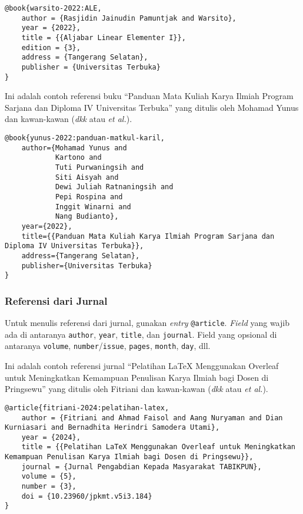 \begin{lstlisting}
@book{warsito-2022:ALE,
    author = {Rasjidin Jainudin Pamuntjak and Warsito},
    year = {2022},
    title = {{Aljabar Linear Elementer I}},
    edition = {3},
    address = {Tangerang Selatan},
    publisher = {Universitas Terbuka}
}
\end{lstlisting}

Ini adalah contoh referensi buku ``Panduan Mata Kuliah Karya Ilmiah Program Sarjana dan Diploma IV Universitas Terbuka'' yang ditulis oleh Mohamad Yunus dan kawan-kawan (\textit{dkk} atau \textit{et al.}).

\begin{lstlisting}
@book{yunus-2022:panduan-matkul-karil,
    author={Mohamad Yunus and 
            Kartono and 
            Tuti Purwaningsih and 
            Siti Aisyah and 
            Dewi Juliah Ratnaningsih and 
            Pepi Rospina and 
            Inggit Winarni and 
            Nang Budianto},
    year={2022},
    title={{Panduan Mata Kuliah Karya Ilmiah Program Sarjana dan Diploma IV Universitas Terbuka}},
    address={Tangerang Selatan},
    publisher={Universitas Terbuka}
}
\end{lstlisting}

\subsubsection{Referensi dari Jurnal}

Untuk menulis referensi dari jurnal, gunakan \textit{entry} \texttt{@article}. \textit{Field} yang wajib ada di antaranya \texttt{author}, \texttt{year}, \texttt{title}, dan \texttt{journal}. Field yang opsional di antaranya \texttt{volume}, \texttt{number}/\texttt{issue}, \texttt{pages}, \texttt{month}, \texttt{day}, dll.

Ini adalah contoh referensi jurnal ``Pelatihan LaTeX Menggunakan Overleaf untuk Meningkatkan Kemampuan Penulisan Karya Ilmiah bagi Dosen di Pringsewu'' yang ditulis oleh Fitriani dan kawan-kawan (\textit{dkk} atau \textit{et al.}).

\begin{lstlisting}
@article{fitriani-2024:pelatihan-latex,
    author = {Fitriani and Ahmad Faisol and Aang Nuryaman and Dian Kurniasari and Bernadhita Herindri Samodera Utami},
    year = {2024},
    title = {{Pelatihan LaTeX Menggunakan Overleaf untuk Meningkatkan Kemampuan Penulisan Karya Ilmiah bagi Dosen di Pringsewu}},
    journal = {Jurnal Pengabdian Kepada Masyarakat TABIKPUN},
    volume = {5},
    number = {3},
    doi = {10.23960/jpkmt.v5i3.184}
}
\end{lstlisting}

